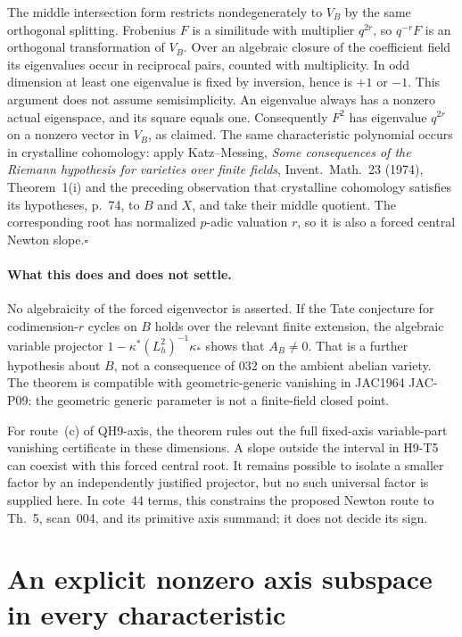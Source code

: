 \documentclass[11pt]{article}
\theoremstyle{remark}\newtheorem{remark}[theorem]{Remark}
\begin{document}
The middle intersection form restricts nondegenerately to $V_B$
by the same orthogonal splitting. Frobenius $F$ is a similitude
with multiplier $q^{2r}$, so $q^{-r}F$ is an orthogonal
transformation of $V_B$. Over an algebraic closure of the
coefficient field its eigenvalues occur in reciprocal pairs,
counted with multiplicity. In odd dimension at least one
eigenvalue is fixed by inversion, hence is $+1$ or $-1$.
This argument does not assume semisimplicity. An eigenvalue
always has a nonzero actual eigenspace, and its square equals
one. Consequently $F^2$ has eigenvalue $q^{2r}$ on a nonzero
vector in $V_B$, as claimed. The same characteristic polynomial
occurs in crystalline cohomology: apply Katz--Messing,
\emph{Some consequences of the Riemann hypothesis for varieties
over finite fields}, Invent.~Math.~23 (1974), Theorem~1(i) and
the preceding observation that crystalline cohomology satisfies
its hypotheses, p.~74, to $B$ and $X$, and take their middle
quotient. The corresponding root has normalized $p$-adic
valuation $r$, so it is also a forced central Newton
slope.\hfill$\square$

\paragraph{What this does and does not settle.}
No algebraicity of the forced eigenvector is asserted. If the
Tate conjecture for codimension-$r$ cycles on $B$ holds over
the relevant finite extension, the algebraic variable projector
$1-\kappa^*(L_h^2)^{-1}\kappa_*$ shows that $A_B\ne0$.
That is a further hypothesis about $B$, not a consequence of
032 on the ambient abelian variety. The theorem is compatible
with geometric-generic vanishing in JAC1964 JAC-P09: the
geometric generic parameter is not a finite-field closed point.

For route~(c) of QH9-axis, the theorem rules out the full
fixed-axis variable-part vanishing certificate in these
dimensions. A slope outside the interval in H9-T5 can coexist
with this forced central root. It remains possible to isolate
a smaller factor by an independently justified projector, but
no such universal factor is supplied here. In cote~44 terms,
this constrains the proposed Newton route to Th.~5, scan~004,
and its primitive axis summand; it does not decide its sign.


\section{An explicit nonzero axis subspace in every characteristic}
\end{document}
